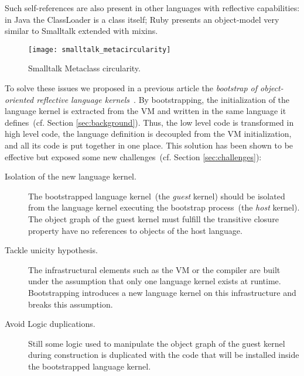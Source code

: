 Such self-references are also present in other languages with reflective capabilities: \eg in Java the ClassLoader is a class itself;
Ruby presents an object-model very similar to Smalltalk extended with mixins.

\begin{figure}[!ht]
\begin{center}
\texttt{[image: smalltalk\_metacircularity]}
\caption{Smalltalk Metaclass circularity.\label{fig:smalltalk_metacircularity}}
\end{center}
\end{figure}

To solve these issues we proposed in a previous article the \emph{bootstrap of object-oriented reflective language kernels}~\cite{Poli13b}. By bootstrapping, the initialization of the language kernel is extracted from the VM and written in the same language it defines~(cf. Section \ref{sec:background}). Thus, the low level code is transformed in high level code, the language definition is decoupled from the VM initialization, and all its code is put together in one place. This solution has been shown to be effective but exposed some new challenges~(cf. Section \ref{sec:challenges}):
\begin{description}

\item[Isolation of the new language kernel.] The bootstrapped language kernel~(the \emph{guest} kernel) should be isolated from the language kernel executing the bootstrap process~(the \emph{host} kernel). The object graph of the guest kernel must fulfill the transitive closure property \ie have no references to objects of the host language. %

\item[Tackle unicity hypothesis.] The infrastructural elements such as the VM or the compiler are built under the assumption that only one language kernel exists at runtime. Bootstrapping introduces a new language kernel on this infrastructure and breaks this assumption.

\item[Avoid Logic duplications.] Still some logic used to manipulate the object graph of the guest kernel during construction is duplicated with the code that will be installed inside the bootstrapped language kernel.

\end{description}


